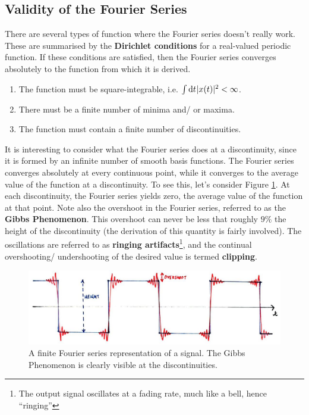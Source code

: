 \subsection{Validity of the Fourier Series}
%
There are several types of function where the Fourier series doesn't really work. These
are summarised by the \textbf{Dirichlet conditions} for a real-valued periodic function. If these
conditions are satisfied, then the Fourier series converges absolutely to the
function from which it is derived.
%
\begin{enumerate}
\item The function must be square-integrable, i.e. $\int \mathrm{d}t\mkern1mu|x(t)|^2 < \infty$.
\item There must be a finite number of minima and/ or maxima.
\item The function must contain a finite number of discontinuities.
\end{enumerate}
%
It is interesting to consider what the Fourier series does at a discontinuity,
since it is formed by an infinite number of smooth basis functions. The Fourier
series converges absolutely at every continuous point, while it converges to the
average value of the function at a discontinuity. To see this, let's consider Figure \ref{fig::lecture_4_gibbs}.
At each discontinuity, the Fourier series yields zero, the average value of the function
at that point. Note also the overshoot in the Fourier series, referred to as the \textbf{Gibbs
Phenomenon}. This overshoot can never be less that roughly $9\%$ the height of the
discontinuity (the derivation of this quantity is fairly involved). The oscillations are
referred to as \textbf{ringing artifacts}\footnote{
  The output signal oscillates at a fading rate, much like a bell, hence ``ringing''
}, and the continual overshooting/ undershooting of the desired value is termed \textbf{clipping}. 
%
\begin{figure}[!htb]
  \includegraphics[width=\textwidth]{images/lecture_4_gibbs.JPG}
  \caption{
    A finite Fourier series representation of a signal. The Gibbs Phenomenon
    is clearly visible at the discontinuities.
  }
  \label{fig::lecture_4_gibbs}
\end{figure}



